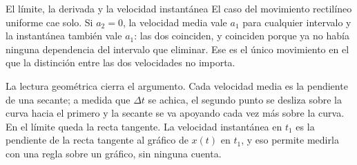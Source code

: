 \documentclass[11pt,openany]{book}
\begin{document}
\begin{bloque}{El límite, la derivada y la velocidad instantánea}
El caso del movimiento rectilíneo uniforme cae solo. Si $a_2 = 0$, la velocidad media vale $a_1$ para cualquier intervalo y la instantánea también vale $a_1$: las dos coinciden, y coinciden porque ya no había ninguna dependencia del intervalo que eliminar. Ese es el único movimiento en el que la distinción entre las dos velocidades no importa.

La lectura geométrica cierra el argumento. Cada velocidad media es la pendiente de una secante; a medida que $\Delta t$ se achica, el segundo punto se desliza sobre la curva hacia el primero y la secante se va apoyando cada vez más sobre la curva. En el límite queda la recta tangente. La velocidad instantánea en $t_1$ es la pendiente de la recta tangente al gráfico de $x(t)$ en $t_1$, y eso permite medirla con una regla sobre un gráfico, sin ninguna cuenta.

\begin{center}
\end{center}
\end{bloque}
\end{document}
